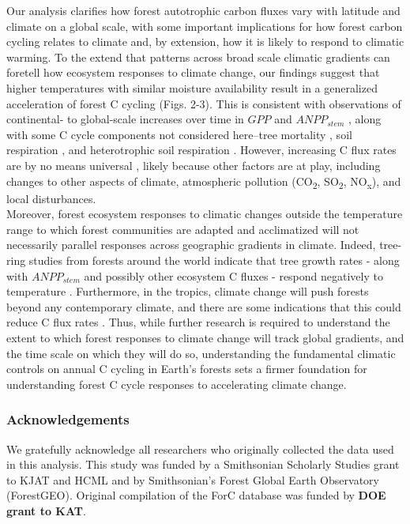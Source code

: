 \documentclass[
]{article}
\begin{document}
Our analysis clarifies how forest autotrophic carbon fluxes vary with
latitude and climate on a global scale, with some important implications
for how forest carbon cycling relates to climate and, by extension, how
it is likely to respond to climatic warming. To the extend that patterns
across broad scale climatic gradients can foretell how ecosystem
responses to climate change, our findings suggest that higher
temperatures with similar moisture availability result in a generalized
acceleration of forest C cycling (Figs. 2-3). This is consistent with
observations of continental- to global-scale increases over time in
\(GPP\) \citep{li_mapping_2019} and \(ANPP_{stem}\)
\citep{brienen_long-term_2015, hubau_asynchronous_2020}, along with some
C cycle components not considered here--tree mortality
\citep{brienen_long-term_2015, mcdowell_drivers_2018}, soil respiration
\citep{bond-lamberty_global_2010}, and heterotrophic soil respiration
\citep{bond-lamberty_globally_2018}. However, increasing C flux rates
are by no means universal
\citep[e.g.,][]{rutishauser_testing_2020, hubau_asynchronous_2020},
likely because other factors are at play, including changes to other
aspects of climate, atmospheric pollution (CO\textsubscript{2},
SO\textsubscript{2}, NO\textsubscript{x}), and local disturbances.\\
Moreover, forest ecosystem responses to climatic changes outside the
temperature range to which forest communities are adapted and
acclimatized will not necessarily parallel responses across geographic
gradients in climate. Indeed, tree-ring studies from forests around the
world indicate that tree growth rates - along with \(ANPP_{stem}\) and
possibly other ecosystem C fluxes - respond negatively to temperature
\citep{sniderhan_growth_2016, helcoski_growing_2019}. Furthermore, in
the tropics, climate change will push forests beyond any contemporary
climate, and there are some indications that this could reduce C flux
rates \citep{mau_temperate_2018, sullivan_long-term_2020}. Thus, while
further research is required to understand the extent to which forest
responses to climate change will track global gradients, and the time
scale on which they will do so, understanding the fundamental climatic
controls on annual C cycling in Earth's forests sets a firmer foundation
for understanding forest C cycle responses to accelerating climate
change.

\hypertarget{acknowledgements}{%
\subsubsection{Acknowledgements}\label{acknowledgements}}

We gratefully acknowledge all researchers who originally collected the
data used in this analysis. This study was funded by a Smithsonian
Scholarly Studies grant to KJAT and HCML and by Smithsonian's Forest
Global Earth Observatory (ForestGEO). Original compilation of the ForC
database was funded by \textbf{DOE grant to KAT}.

  
\end{document}
